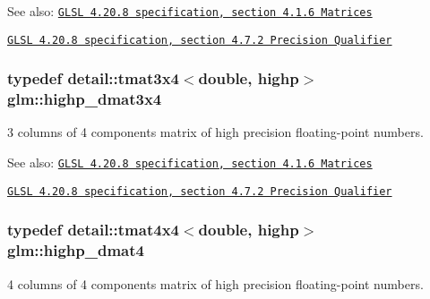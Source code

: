 \begin{Desc}
\item[See also:]\href{http://www.opengl.org/registry/doc/GLSLangSpec.4.20.8.pdf}{\tt GLSL 4.20.8 specification, section 4.1.6 Matrices} 

\href{http://www.opengl.org/registry/doc/GLSLangSpec.4.20.8.pdf}{\tt GLSL 4.20.8 specification, section 4.7.2 Precision Qualifier} \end{Desc}
\hypertarget{group__core__precision_gff199c8d04a8edb92ed43283e8694c59}{
\subsubsection[highp\_\-dmat3x4]{\setlength{\rightskip}{0pt plus 5cm}typedef detail::tmat3x4$<$double, highp$>$ {\bf glm::highp\_\-dmat3x4}}}
\label{group__core__precision_gff199c8d04a8edb92ed43283e8694c59}


3 columns of 4 components matrix of high precision floating-point numbers.

\begin{Desc}
\item[See also:]\href{http://www.opengl.org/registry/doc/GLSLangSpec.4.20.8.pdf}{\tt GLSL 4.20.8 specification, section 4.1.6 Matrices} 

\href{http://www.opengl.org/registry/doc/GLSLangSpec.4.20.8.pdf}{\tt GLSL 4.20.8 specification, section 4.7.2 Precision Qualifier} \end{Desc}
\hypertarget{group__core__precision_g9a5d95e476d451d28d3939ac7f124baf}{
\subsubsection[highp\_\-dmat4]{\setlength{\rightskip}{0pt plus 5cm}typedef detail::tmat4x4$<$double, highp$>$ {\bf glm::highp\_\-dmat4}}}
\label{group__core__precision_g9a5d95e476d451d28d3939ac7f124baf}


4 columns of 4 components matrix of high precision floating-point numbers.

